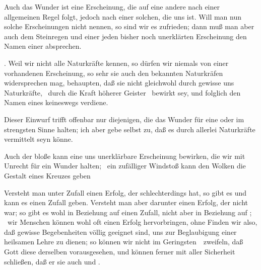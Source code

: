  Auch das Wunder ist eine Erscheinung, die auf eine andere nach einer allgemeinen Regel folgt, jedoch nach einer solchen, die uns  ist. Will man nun solche Erscheinungen nicht  nennen, so sind wir es zufrieden; dann muß man aber auch dem Steinregen und einer jeden bisher noch unerklärten Erscheinung den Namen einer  absprechen.\par
{} . Weil wir nicht alle Naturkräfte kennen, so  dürfen wir niemals von einer vorhandenen Erscheinung, so sehr sie auch den  bekannten Naturkräfen widersprechen mag, behaupten, daß sie nicht gleichwohl durch gewisse uns  Naturkräfte, \zB\ durch die Kraft höherer Geister \udgl\  bewirkt sey, und folglich den Namen eines  keineswegs verdiene.\par
{} Dieser Einwurf trifft offenbar nur diejenigen, die das Wunder für eine  oder  im strengsten Sinne halten; ich aber gebe selbst zu, daß es durch allerlei Naturkräfte vermittelt seyn könne.\par
{} Auch der bloße  kann eine uns unerklärbare Erscheinung bewirken, die wir mit Unrecht für ein Wunder halten; \zB\ ein zufälliger Windstoß kann den Wolken die Gestalt eines Kreuzes geben \udgl \par
{} Versteht man unter Zufall einen Erfolg, der schlechterdings  hat, so gibt es und kann es  einen Zufall geben. Versteht man aber darunter einen Erfolg, der nicht  war; so gibt es wohl in Beziehung auf  einen Zufall, nicht aber in Beziehung auf ; \dh\ wir Menschen können wohl oft einen Erfolg hervorbringen, ohne  Finden wir also, daß gewisse Begebenheiten völlig geeignet sind, uns zur Beglaubigung einer heilsamen Lehre zu dienen; so können wir nicht im Geringsten~\ zweifeln, daß Gott diese  derselben vorausgesehen, und können ferner mit aller Sicherheit schließen, daß er sie auch  und .
   
